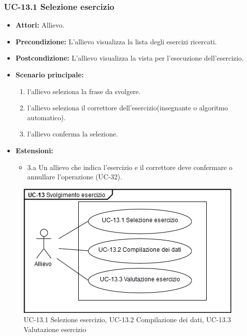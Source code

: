 	\subsubsection{UC-13.1 Selezione esercizio}
	\begin{itemize}
			\item \textbf{Attori:} Allievo.
			\item \textbf{Precondizione:} L'allievo visualizza la lista degli esercizi ricercati.
			\item \textbf{Postcondizione:} L'allievo visualizza la vista per l'esecuzione dell'esercizio.
			\item \textbf{Scenario principale:}
				\begin{enumerate}
					\item l'allievo seleziona la frase da svolgere.
					\item l'allievo seleziona il correttore dell'esercizio(insegnante o algoritmo automatico).
					\item l'allievo conferma la selezione.
				\end{enumerate}
			\item \textbf{Estensioni:}
			\begin{itemize}
		\item 3.a Un allievo che indica l'esercizio e il correttore  deve confermare o annullare l'operazione (UC-32).
			\end{itemize}
			\end{itemize}
			\begin{figure}[h]
		\centering
		\includegraphics[scale=0.7]{images/UC-13_1.png}
		\caption{UC-13.1 Selezione esercizio, UC-13.2 Compilazione dei dati, UC-13.3 Valutazione esercizio}
	\end{figure}

